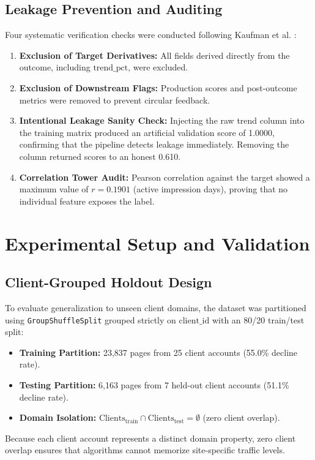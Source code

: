 \documentclass[conference]{IEEEtran}
\begin{document}
\subsection{Leakage Prevention and Auditing}
Four systematic verification checks were conducted following Kaufman et al. \cite{kaufman2012leakage}:
\begin{enumerate}
    \item \textbf{Exclusion of Target Derivatives:} All fields derived directly from the outcome, including $\text{trend\_pct}$, were excluded.
    \item \textbf{Exclusion of Downstream Flags:} Production scores and post-outcome metrics were removed to prevent circular feedback.
    \item \textbf{Intentional Leakage Sanity Check:} Injecting the raw trend column into the training matrix produced an artificial validation score of 1.0000, confirming that the pipeline detects leakage immediately. Removing the column returned scores to an honest 0.610.
    \item \textbf{Correlation Tower Audit:} Pearson correlation against the target showed a maximum value of $r = 0.1901$ (active impression days), proving that no individual feature exposes the label.
\end{enumerate}

\section{Experimental Setup and Validation}
\subsection{Client-Grouped Holdout Design}
To evaluate generalization to unseen client domains, the dataset was partitioned using \texttt{GroupShuffleSplit} grouped strictly on $\text{client\_id}$ with an 80/20 train/test split:
\begin{itemize}
    \item \textbf{Training Partition:} 23,837 pages from 25 client accounts (55.0\% decline rate).
    \item \textbf{Testing Partition:} 6,163 pages from 7 held-out client accounts (51.1\% decline rate).
    \item \textbf{Domain Isolation:} $\text{Clients}_{\text{train}} \cap \text{Clients}_{\text{test}} = \emptyset$ (zero client overlap).
\end{itemize}
Because each client account represents a distinct domain property, zero client overlap ensures that algorithms cannot memorize site-specific traffic levels.
\end{document}
